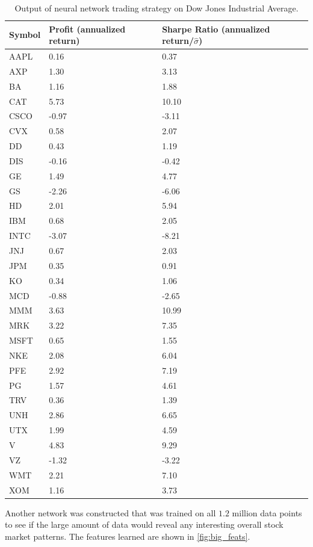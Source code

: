 \documentclass{article}
\begin{document}
\begin{table}[ht]
\caption{Output of neural network trading strategy on Dow Jones Industrial Average.}
\label{profit_table}
\centering
\begin{tabular}{lll}
    Symbol & Profit (annualized return) & Sharpe Ratio (annualized return/$\hat{\sigma}$) \\ 
\toprule
    AAPL & 0.16 & 0.37 \\
    AXP & 1.30 & 3.13 \\
    BA & 1.16 & 1.88 \\
    CAT & 5.73 & 10.10 \\
    CSCO & -0.97 & -3.11 \\
    CVX & 0.58 & 2.07 \\
    DD & 0.43 & 1.19 \\
    DIS & -0.16 & -0.42 \\
    GE & 1.49 & 4.77 \\
    GS & -2.26 & -6.06 \\
    HD & 2.01 & 5.94 \\
    IBM & 0.68 & 2.05 \\
    INTC & -3.07 & -8.21 \\
    JNJ & 0.67 & 2.03 \\
    JPM & 0.35 & 0.91 \\
    KO & 0.34 & 1.06 \\
    MCD & -0.88 & -2.65 \\
    MMM & 3.63 & 10.99 \\
    MRK & 3.22 & 7.35 \\
    MSFT & 0.65 & 1.55 \\
    NKE & 2.08 & 6.04 \\
    PFE & 2.92 & 7.19 \\
    PG & 1.57 & 4.61 \\
    TRV & 0.36 & 1.39 \\
    UNH & 2.86 & 6.65 \\
    UTX & 1.99 & 4.59 \\
    V & 4.83 & 9.29 \\
    VZ & -1.32 & -3.22 \\
    WMT & 2.21 & 7.10 \\
    XOM & 1.16 & 3.73 \\
\end{tabular}
\end{table}

Another network was constructed that was trained on all $1.2$ million data points
to see if the large amount of data would reveal any interesting overall stock
market patterns. The features learned are shown in \ref{fig:big_feats}.
\end{document}
